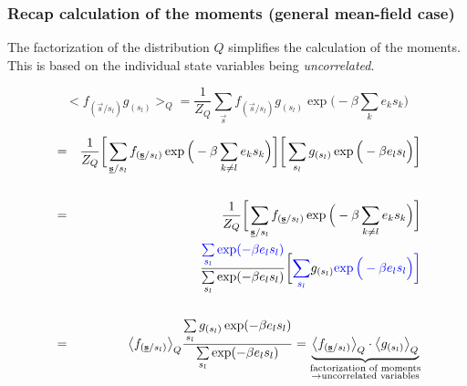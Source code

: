 \begin{frame}\frametitle{Recap calculation of the moments (general mean-field case)}
The factorization of the distribution $Q$ simplifies the calculation of the moments. 
This is based on the individual state variables being \emph{uncorrelated}.

\begin{equation}\label{eq:factorizingMoments}
	\Big< f_{(\vec{s}/s_l)} g_{(s_l)} \Big>_Q
	 = \frac{1}{Z_Q} \sum\limits_{\vec{s}} f_{(\vec{s}/s_l)}
		g_{(s_l)} \exp \Big( -\beta \sum\limits_k e_k s_k \Big)
\end{equation}

\end{frame}
\begin{frame}
\begin{eqnarray*}
	& = & \frac{1}{Z_Q} \bigg[ \sum\limits_{\vec{s}/s_l} f_{(\vec{s}/s_l)}
		\exp \Big( -\beta \sum\limits_{k \neq l} e_k s_k \Big) \bigg]
		\bigg[ \sum\limits_{s_l} g_{(s_l)} \exp \Big( -\beta e_l
			s_l \Big) \bigg] \\\\
	& = & \frac{1}{Z_Q} \bigg[ \sum\limits_{\vec{s}/s_l} f_{(\vec{s}/s_l)}
		\exp \Big( -\beta \sum\limits_{k \neq l} e_k s_k \Big) \bigg]\\
		&&\qquad\qquad
  \frac{\color{blue}{\sum\limits_{s_l} \exp(-\beta e_l s_l)}}{\sum\limits_{s_l}
		\exp(-\beta e_l s_l)}
		\bigg[ {\color{blue}\sum\limits_{s_l}} g_{(s_l)} \color{blue}{\exp \Big( -\beta e_l
			s_l \Big)} \bigg] \\\\
	& = &\big< f_{(\vec{s}/s_l)} \big>_Q \frac{\sum\limits_{s_l}
		g_{(s_l)} \exp(-\beta e_l s_l)}{\sum\limits_{s_l}
		\exp(-\beta e_l s_l)} = 
	\underbrace{ \big< f_{(\vec{s}/s_l)} \big>_Q \cdot \big<g_{(s_l)} 
		\big>_Q }_{ 	\substack{ \text{factorization of moments} \\
				\rightarrow \text{uncorrelated variables}} }
\end{eqnarray*}

\end{frame}

